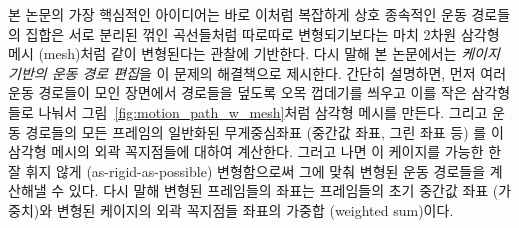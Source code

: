\documentclass[12pt,a4paper,oneside,final]{report}
\begin{document}
본 논문의 가장 핵심적인 아이디어는 바로 이처럼 복잡하게 상호 종속적인 운동
경로들의 집합은 서로 분리된 꺾인 곡선들처럼 따로따로 변형되기보다는 마치 2차원
삼각형 메시 (mesh)처럼 같이 변형된다는 관찰에 기반한다. 다시 말해 본 논문에서는
\emph{케이지 기반의 운동 경로 편집}을 이 문제의 해결책으로 제시한다. 간단히
설명하면, 먼저 여러 운동 경로들이 모인 장면에서 경로들을 덮도록 오목 껍데기를
씌우고 이를 작은 삼각형들로 나눠서 그림~\ref{fig:motion_path_w_mesh}처럼 삼각형
메시를 만든다. 그리고 운동 경로들의 모든 프레임의 일반화된 무게중심좌표 (중간값
좌표, 그린 좌표 등) 를 이 삼각형 메시의 외곽 꼭지점들에 대하여 계산한다. 그러고
나면 이 케이지를 가능한 한 잘 휘지 않게 (as-rigid-as-possible) 변형함으로써
그에 맞춰 변형된 운동 경로들을 계산해낼 수 있다. 다시 말해 변형된 프레임들의
좌표는 프레임들의 초기 중간값 좌표 (가중치)와 변형된 케이지의 외곽 꼭지점들
좌표의 가중합 (weighted sum)이다.


%

%
%
\end{document}

